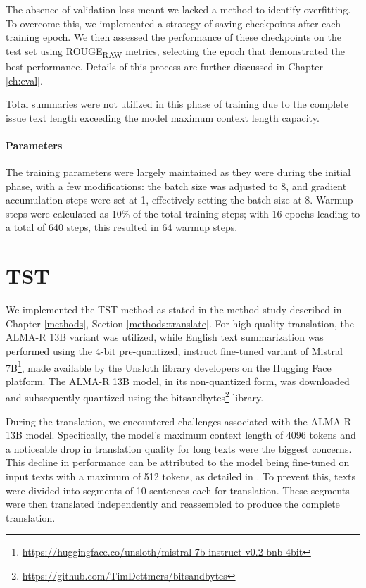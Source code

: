 \documentclass[english, ba, kiv, he, iso690numb, pdf, viewonly]{fasthesis}
\begin{document}
The absence of validation loss meant we lacked a method to identify overfitting. To overcome this, we implemented a strategy of saving checkpoints after each training epoch. We then assessed the performance of these checkpoints on the test set using ROUGE\textsubscript{RAW} metrics, selecting the epoch that demonstrated the best performance. Details of this process are further discussed in Chapter \ref{ch:eval}.

Total summaries were not utilized in this phase of training due to the complete issue text length exceeding the model maximum context length capacity.
\paragraph{Parameters}
The training parameters were largely maintained as they were during the initial phase, with a few modifications: the batch size was adjusted to 8, and gradient accumulation steps were set at 1, effectively setting the batch size at 8. Warmup steps were calculated as 10\% of the total training steps; with 16 epochs leading to a total of 640 steps, this resulted in 64 warmup steps.

\section{TST}
We implemented the TST method as stated in the method study described in Chapter \ref{methods}, Section \ref{methods:translate}. For high-quality translation, the ALMA-R 13B variant was utilized, while English text summarization was performed using the 4-bit pre-quantized, instruct fine-tuned variant of Mistral 7B\footnote{\url{https://huggingface.co/unsloth/mistral-7b-instruct-v0.2-bnb-4bit}}, made available by the Unsloth library developers on the Hugging Face platform. The ALMA-R 13B model, in its non-quantized form, was downloaded and subsequently quantized using the bitsandbytes\footnote{\url{https://github.com/TimDettmers/bitsandbytes}} library.

During the translation, we encountered challenges associated with the ALMA-R 13B model. Specifically, the model's maximum context length of 4096 tokens and a noticeable drop in translation quality for long texts were the biggest concerns. This decline in performance can be attributed to the model being fine-tuned on input texts with a maximum of 512 tokens, as detailed in \cite{xu2024contrastive}. To prevent this, texts were divided into segments of 10 sentences each for translation. These segments were then translated independently and reassembled to produce the complete translation. 
\end{document}
